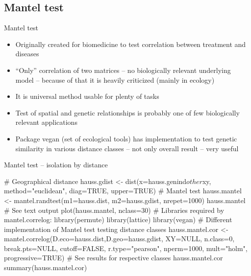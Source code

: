 \documentclass[compress, ucs, xelatex, 11pt, xcolor=svgnames,
  hyperref={
    bookmarks=true,
    unicode=true,
    colorlinks=true,
    pdftitle={Molecular data in R},
    plainpages=false,
    pdfauthor={Vojtech Zeisek},
    pdfsubject={Course about phylogeny and evolution in R},
    pdfcreator={XeLaTeX},
    pdfkeywords={R, evolution, phylogeny, molecular data},
    linkcolor=Tomato,
    anchorcolor=SaddleBrown,
    citecolor=Goldenrod,
    filecolor=DarkMagenta,
    menucolor=Sienna,
    urlcolor=DarkTurquoise,
    pdftex},
  url={hyphens, lowtilde} %
  ]{beamer}
\begin{document}
\subsection{Mantel test}

\begin{frame}{Mantel test}
  \begin{itemize}
    \item Originally created for biomedicine to test correlation between treatment and diseases
    \item ``Only'' correlation of two matrices -- no biologically relevant underlying model -- because of that it is heavily criticized (mainly in ecology)
    \item It is universal method usable for plenty of tasks
    \item Test of spatial and genetic relationships is probably one of few biologically relevant applications
    \item Package vegan (set of ecological tools) has implementation to test genetic similarity in various distance classes -- not only overall result -- very useful
  \end{itemize}
\end{frame}

\begin{frame}[fragile]{Mantel test -- isolation by distance}
  \begin{spluscode}
    # Geographical distance
    hauss.gdist <- dist(x=hauss.genind$other$xy, method="euclidean",
      diag=TRUE, upper=TRUE)
    # Mantel test
    hauss.mantel <- mantel.randtest(m1=hauss.dist, m2=hauss.gdist,
      nrepet=1000)
    hauss.mantel # See text output
    plot(hauss.mantel, nclass=30)
    # Libraries required by mantel.correlog:
    library(permute)
    library(lattice)
    library(vegan)
    # Different implementation of Mantel test testing distance classes
    hauss.mantel.cor <- mantel.correlog(D.eco=hauss.dist,D.geo=hauss.gdist,
      XY=NULL, n.class=0, break.pts=NULL, cutoff=FALSE, r.type="pearson",
      nperm=1000, mult="holm", progressive=TRUE)
    # See results for respective classes
    hauss.mantel.cor
    summary(hauss.mantel.cor)
  \end{spluscode}
\end{frame}
\end{document}
